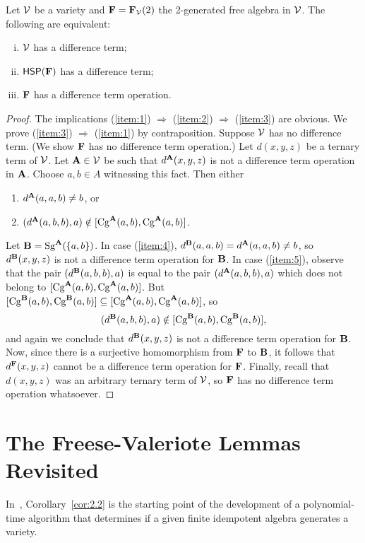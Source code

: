 \begin{thm}
  \label{thm:F}
Let $\mathcal{V}$ be a variety and $\mathbf{F} = \mathbf{F}_{\mathcal{V}}(2)$ the 2-generated
free algebra in $\mathcal{V}$. The following are equivalent:
\begin{enumerate}[(i)]
\item \label{item:1}
  $\mathcal{V}$ has a difference term;
\item \label{item:2}
  $\mathsf{H} \mathsf{S} \mathsf{P} (\mathbf{F})$ has a difference term;
\item \label{item:3}
  $\mathbf{F}$ has a difference term operation.
\end{enumerate}
\end{thm}
\begin{proof}
  The implications
  (\ref{item:1}) $\Rightarrow$  (\ref{item:2}) $\Rightarrow$  (\ref{item:3}) are
  obvious. We prove
  (\ref{item:3}) $\Rightarrow$  (\ref{item:1}) by contraposition.
  Suppose $\mathcal{V}$ has no difference term. (We show $\mathbf{F}$ has no difference term
  operation.)
  Let $d(x,y,z)$ be a ternary term of $\mathcal{V}$.  Let $\mathbf{A}\in \mathcal{V}$ be such that
  $d^{\mathbf{A}}(x,y,z)$ is not a difference term operation in $\mathbf{A}$.
  Choose $a, b \in A$ witnessing this fact.  Then either
  \begin{enumerate}
  \item\label{item:4} $d^{\mathbf{A}}(a,a,b) \neq b$, or
  \item\label{item:5} $(d^{\mathbf{A}}(a,b,b), a) \notin [\operatorname{Cg}^{\mathbf{A}} (a, b), \operatorname{Cg}^{\mathbf{A}} (a,b)]$.
  \end{enumerate}
  Let $\mathbf{B} = \operatorname{Sg}^{\mathbf{A}} (\{a, b\})$.  In case
  (\ref{item:4}), 
  $d^{\mathbf{B}}(a,a,b) = d^{\mathbf{A}}(a,a,b) \neq b$, so $d^{\mathbf{B}}(x,y,z)$ is not a difference
  term operation for $\mathbf{B}$.
  In case (\ref{item:5}), observe that
  the pair $(d^{\mathbf{B}}(a,b,b), a)$ is equal to the pair $(d^{\mathbf{A}}(a,b,b), a)$ which
  does not belong to $[\operatorname{Cg}^{\mathbf{A}} (a, b), \operatorname{Cg}^{\mathbf{A}} (a,b)]$.
  But 
  $[\operatorname{Cg}^{\mathbf{B}} (a, b), \operatorname{Cg}^{\mathbf{B}} (a,b)] \subseteq[\operatorname{Cg}^{\mathbf{A}} (a, b), \operatorname{Cg}^{\mathbf{A}} (a,b)]$, so
  \[(d^{\mathbf{B}}(a,b,b), a) \notin [\operatorname{Cg}^{\mathbf{B}} (a, b), \operatorname{Cg}^{\mathbf{B}} (a,b)],\]
  and again we conclude that $d^{\mathbf{B}}(x,y,z)$ is not a difference term operation for $\mathbf{B}$.
  Now, since there is a surjective homomorphism from $\mathbf{F}$ to $\mathbf{B}$,
  it follows that $d^{\mathbf{F}}(x,y,z)$ cannot be a difference term operation for $\mathbf{F}$.
  Finally, recall that $d(x,y,z)$ was an arbitrary ternary term of $\mathcal{V}$, so
  $\mathbf{F}$ has no difference term operation whatsoever.
\end{proof}


\section{The Freese-Valeriote Lemmas Revisited}
\label{sec:freese-valer-lemm}
In~\cite{Freese:2009}, Corollary~\ref{cor:2.2} is the starting point of the
development of a polynomial-time algorithm that determines if a given finite
idempotent algebra generates a \cm variety. 

